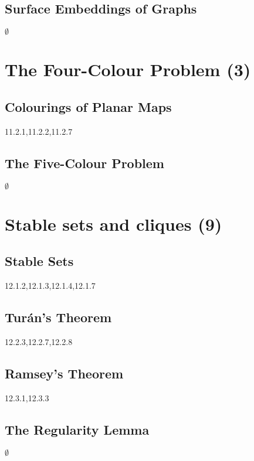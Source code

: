 \documentclass[12pt]{article}
\begin{document}
\subsection{Surface Embeddings of Graphs}


$\emptyset$

\newpage

\section{The Four-Colour Problem (3)}

\subsection{Colourings of Planar Maps}

11.2.1,11.2.2,11.2.7

\subsection{The Five-Colour Problem}

$\emptyset$


\newpage

\section{Stable sets and cliques (9)}

\subsection{Stable Sets}

12.1.2,12.1.3,12.1.4,12.1.7

\subsection{Turán’s Theorem}

12.2.3,12.2.7,12.2.8

\subsection{Ramsey’s Theorem}

12.3.1,12.3.3


\subsection{The Regularity Lemma}

$\emptyset$
\end{document}
